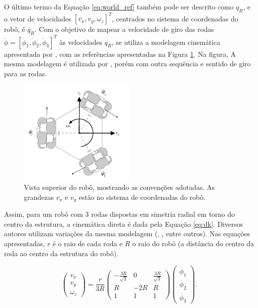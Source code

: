 O último termo da Equação \ref{eq:world_ref} também pode ser descrito como $q_R$, e o vetor de velocidades $[v_x, v_y, \omega_z]^T$, centrados no sistema de coordenadas do robô, é $\dot{q_R}$. Com o objetivo de mapear a velocidade de giro das rodas $\dot{\phi} = [\dot{\phi}_1, \dot{\phi}_2, \dot{\phi}_3]^T$ às velocidades $\dot{q_R}$, se utiliza a modelagem cinemática apresentada por \citet{siegwart2011introduction}, com as referências apresentadas na Figura \ref{fig:robo_vel}. Na figura,  A mesma modelagem é utilizada por \citet{ritter2016modelagem}, porém com outra sequência e sentido de giro para as rodas.

\begin{figure}[h]
  \centering
  \includegraphics[width = 0.5\textwidth]{imagens/robot_vel4}
  \caption{Vista superior do robô, mostrando as convenções adotadas. As grandezas $v_x$ e $v_y$ estão no sistema de coordenadas do robô.}
  \label{fig:robo_vel}
\end{figure}

Assim, para um robô com 3 rodas dispostas em simetria radial em torno do centro da estrutura, a cinemática direta é dada pela Equação \ref{eq:dk}. Diversos autores utilizam variações da mesma modelagem (\citet{rojas2006holonomic}, \citet{pin1994new}, entre outros). Nas equações apresentadas, $r$ é o raio de cada roda e $R$ o raio do robô (a distância do centro da roda ao centro da estrutura do robô).

\begin{equation}
  \begin{pmatrix}
    v_x \\
    v_y \\
    \omega_z
  \end{pmatrix}
  =
  \frac{r}{3R}
  \begin{pmatrix}
    -\frac{3R}{\sqrt{3}} & 0   & \frac{3R}{\sqrt{3}} \\
    R                    & -2R & R                   \\
    1                    & 1   & 1
  \end{pmatrix}
  \begin{pmatrix}
    \dot{\phi_1} \\
    \dot{\phi_2} \\
    \dot{\phi_3}
  \end{pmatrix}.
  \label{eq:dk}
\end{equation}

